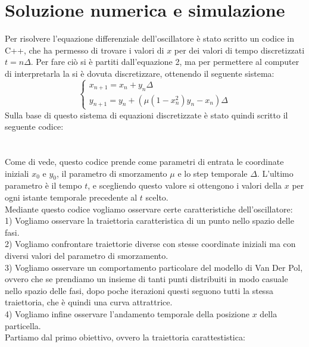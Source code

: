 \documentclass[12pt]{article}
\begin{document}
\section{Soluzione numerica e simulazione}
Per risolvere l'equazione differenziale dell'oscillatore è stato scritto un codice in C++, che ha permesso di trovare i valori di $x$ per dei valori di tempo discretizzati $t = n\Delta$. Per fare ciò si è partiti dall'equazione 2, ma per permettere al computer di interpretarla la si è dovuta discretizzare, ottenendo il seguente sistema:
\begin{equation}
	\begin{cases}
	x_{n+1} = x_n + y_n\Delta \\
	y_{n+1} = y_n + \left(\mu(1-x_n^2)y_n - x_n\right)\Delta
	\end{cases}
\end{equation} 
Sulla base di questo sistema di equazioni discretizzate è stato quindi scritto il seguente codice: \\ \\ \\
Come di vede, questo codice prende come parametri di entrata le coordinate iniziali $x_0$ e $y_0$, il parametro di smorzamento $\mu$ e lo step temporale $\Delta$. L'ultimo parametro è il tempo $t$, e scegliendo questo valore si ottengono i valori della $x$ per ogni istante temporale precedente al $t$ scelto. \\
Mediante questo codice vogliamo osservare certe caratteristiche dell'oscillatore: \\
1) Vogliamo osservare la traiettoria caratteristica di un punto nello spazio delle fasi. \\
2) Vogliamo confrontare traiettorie diverse con stesse coordinate iniziali ma con diversi valori del parametro di smorzamento. \\
3) Vogliamo osservare un comportamento particolare del modello di Van Der Pol, ovvero che se prendiamo un insieme di tanti punti distribuiti in modo casuale nello spazio delle fasi, dopo poche iterazioni questi seguono tutti la stessa traiettoria, che è quindi una curva attrattrice. \\
4) Vogliamo infine osservare l'andamento temporale della posizione $x$ della particella. \\
Partiamo dal primo obiettivo, ovvero la traiettoria carattestistica: 
\end{document}
